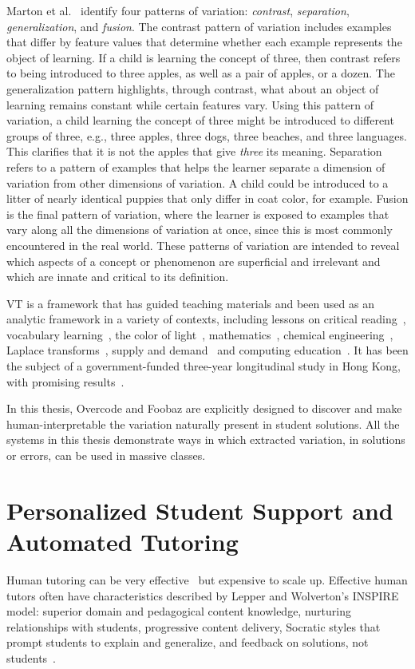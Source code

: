 Marton et al.~\cite{marton1997learning} identify four patterns of variation: {\it contrast}, {\it separation}, {\it generalization}, and {\it fusion}. The contrast pattern of variation includes examples that differ by feature values that determine whether each example represents the object of learning. If a child is learning the concept of three, then contrast refers to being introduced to three apples, as well as a pair of apples, or a dozen. The generalization pattern highlights, through contrast, what about an object of learning remains constant while certain features vary. Using this pattern of variation, a child learning the concept of three might be introduced to different groups of three, e.g., three apples, three dogs, three beaches, and three languages. This clarifies that it is not the apples that give {\it three} its meaning. Separation refers to a pattern of examples that helps the learner separate a dimension of variation from other dimensions of variation. A child could be introduced to a litter of nearly identical puppies that only differ in coat color, for example. Fusion is the final pattern of variation, where the learner is exposed to examples that vary along all the dimensions of variation at once, since this is most commonly encountered in the real world. These patterns of variation are intended to reveal which aspects of a concept or phenomenon are superficial and irrelevant and which are innate and critical to its definition.

VT is a framework that has guided teaching materials and been used as an analytic framework in a variety of contexts, including lessons on critical reading~\cite{noble1998contents}, vocabulary learning~\cite{doi:10.1108/IJLLS-10-2014-0038}, the color of light~\cite{Ling2006}, mathematics~\cite{Pythagoras233}, chemical engineering~\cite{C2RP20145C}, Laplace transforms~\cite{carstensen2004laplace}, supply and demand~\cite{marton2006some} and computing education~\cite{suhonen2007applications}. It has been the subject of a government-funded three-year longitudinal study in Hong Kong, with promising results~\cite{lo2005each}. 

In this thesis, Overcode and Foobaz are explicitly designed to discover and make human-interpretable the variation naturally present in student solutions. All the systems in this thesis demonstrate ways in which extracted variation, in solutions or errors, can be used in massive classes. 

\section{Personalized Student Support and Automated Tutoring}
Human tutoring can be very effective~\cite{bloom} but expensive to scale up. Effective human tutors often have characteristics described by Lepper and Wolverton's INSPIRE model: superior domain and pedagogical content knowledge, nurturing relationships with students, progressive content delivery, Socratic styles that prompt students to explain and generalize, and feedback on solutions, not students~\cite{wood2012role}.

